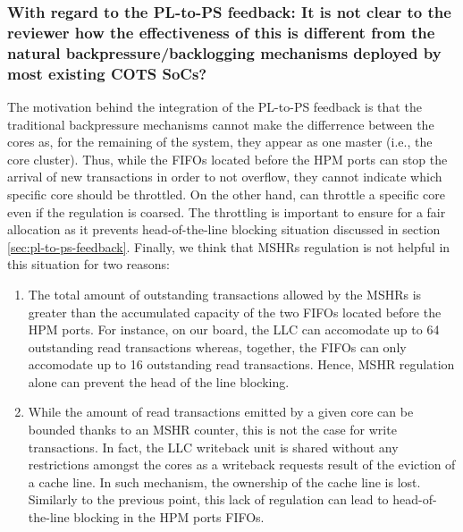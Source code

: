 
        \subsubsection{With regard to the PL-to-PS feedback: It is not clear to the reviewer how the effectiveness of this is different from the natural backpressure/backlogging mechanisms deployed by most existing COTS SoCs?}
            The motivation behind the integration of the PL-to-PS feedback is that the traditional backpressure mechanisms cannot make the differrence between the cores as, for the remaining of the system, they appear as one master (i.e., the core cluster).
            Thus, while the FIFOs located before the HPM ports can stop the arrival of new transactions in order to not overflow, they cannot indicate which specific core should be throttled. On the other hand, \schim can throttle a specific core even if the regulation is coarsed.
            The throttling is important to ensure for a fair allocation as it prevents head-of-the-line blocking situation discussed in section \ref{sec:pl-to-ps-feedback}.
            Finally, we think that MSHRs regulation is not helpful in this situation for two reasons:
            \begin{enumerate}
                \item The total amount of outstanding transactions allowed by the MSHRs is greater than the accumulated capacity of the two FIFOs located before the HPM ports. For instance, on our board, the LLC can accomodate up to 64 outstanding read transactions whereas, together, the FIFOs can only accomodate up to 16 outstanding read transactions. Hence, MSHR regulation alone can prevent the head of the line blocking.
                \item While the amount of read transactions emitted by a given core can be bounded thanks to an MSHR counter, this is not the case for write transactions. In fact, the LLC writeback unit is shared without any restrictions amongst the cores as a writeback requests result of the eviction of a cache line. In such mechanism, the ownership of the cache line is lost. Similarly to the previous point, this lack of regulation can lead to head-of-the-line blocking in the HPM ports FIFOs.
            \end{enumerate}

